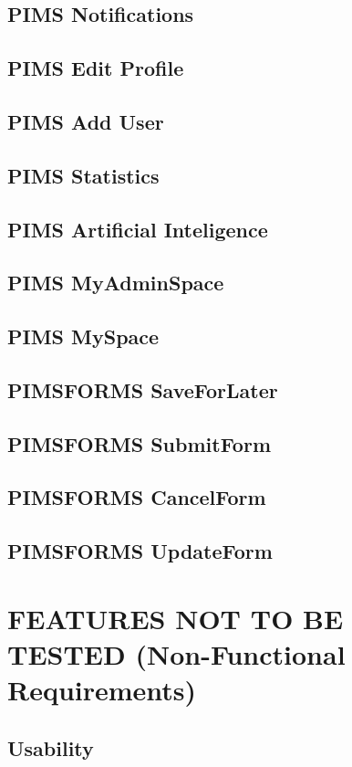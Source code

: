\documentclass[a4paper,12pt,titlepage,margin=1in]{article}
\begin{document}
	\subsection{PIMS Notifications}
	
	\subsection{PIMS Edit Profile}
	
	\subsection{PIMS Add User}
	
	\subsection{PIMS Statistics}
	
	\subsection{PIMS Artificial Inteligence}
	\subsection{PIMS MyAdminSpace}
	\subsection{PIMS MySpace}
	\subsection{PIMSFORMS SaveForLater}
	\subsection{PIMSFORMS SubmitForm}
	\subsection{PIMSFORMS CancelForm}
	\subsection{PIMSFORMS UpdateForm}
	
\section{FEATURES NOT TO BE TESTED (Non-Functional Requirements)}
	\subsection{Usability}
\end{document}

